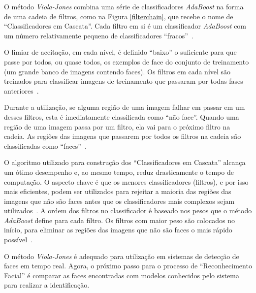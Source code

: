 	O método \textit{Viola-Jones} combina uma série de classificadores
	\textit{AdaBoost} na forma de uma cadeia de filtros, como na Figura
	\ref{filterchain}, que recebe o nome de ``Classificadores em Cascata''. Cada
	filtro em si é um classificador \textit{AdaBoost} com um número relativamente
	pequeno de classificadores ``fracos''~\cite{servodetection}.
	
	O limiar de aceitação, em cada nível, é definido ``baixo'' o suficiente para que
	passe por todos, ou quase todos, os exemplos de face do conjunto de treinamento
	(um grande banco de imagens contendo faces). Os filtros em cada nível são
	treinados para classificar imagens de treinamento que passaram por todas fases
	anteriores~\cite{servodetection}.
	
	Durante a utilização, se alguma região de uma imagem falhar em passar em um
	desses filtros, esta é imediatamente classificada como ``não face''. Quando uma
	região de uma imagem passa por um filtro, ela vai para o próximo filtro na
	cadeia. As regiões das imagens que passarem por todos os filtros na cadeia são
	classificadas como ``faces''~\cite{servodetection}.
	
	O algoritmo utilizado para construção dos ``Classificadores em Cascata'' alcança
	um ótimo desempenho e, ao mesmo tempo, reduz drasticamente o tempo de
	computação. O aspecto chave é que os menores classificadores (filtros), e por
	isso mais eficientes, podem ser utilizados para rejeitar a maioria das regiões
	das imagens que não são faces antes que os classificadores mais complexos sejam
	utilizados~\cite{violajones}. A ordem dos filtros no classificador é baseado nos
	pesos que o método \textit{AdaBoost} define para cada filtro. Os filtros com
	maior peso são colocados no início, para eliminar as regiões das imagens que não
	são faces o mais rápido possível~\cite{servodetection}.
	
	O método \textit{Viola-Jones} é adequado para utilização em sistemas de detecção
	de faces em tempo real. Agora, o próximo passo para o processo de
	``Reconhecimento Facial'' é comparar as faces encontradas com modelos conhecidos
	pelo sistema para realizar a identificação.


